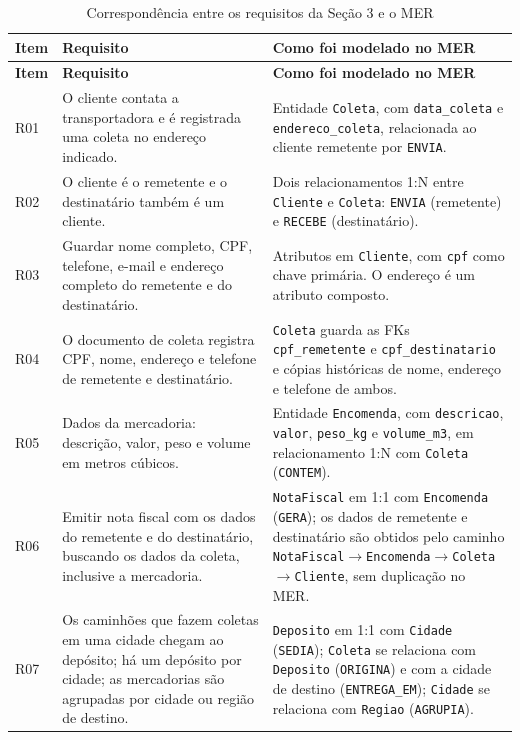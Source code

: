 {\small
\begin{longtable}{@{}L{1.0cm}L{4.6cm}L{9.4cm}@{}}
\caption{Correspondência entre os requisitos da Seção 3 e o MER}
\label{tab:requisitos_mer}\\
\toprule
\textbf{Item} & \textbf{Requisito} & \textbf{Como foi modelado no MER}\\
\midrule
\endfirsthead
\toprule
\textbf{Item} & \textbf{Requisito} & \textbf{Como foi modelado no MER}\\
\midrule
\endhead
\bottomrule
\endfoot

R01 & O cliente contata a transportadora e é registrada uma coleta no endereço indicado. & Entidade \texttt{Coleta}, com \texttt{data\_coleta} e \texttt{endereco\_coleta}, relacionada ao cliente remetente por \texttt{ENVIA}.\\

R02 & O cliente é o remetente e o destinatário também é um cliente. & Dois relacionamentos 1:N entre \texttt{Cliente} e \texttt{Coleta}: \texttt{ENVIA} (remetente) e \texttt{RECEBE} (destinatário).\\

R03 & Guardar nome completo, CPF, telefone, e-mail e endereço completo do remetente e do destinatário. & Atributos em \texttt{Cliente}, com \texttt{cpf} como chave primária. O endereço é um atributo composto.\\

R04 & O documento de coleta registra CPF, nome, endereço e telefone de remetente e destinatário. & \texttt{Coleta} guarda as FKs \texttt{cpf\_remetente} e \texttt{cpf\_destinatario} e cópias históricas de nome, endereço e telefone de ambos.\\

R05 & Dados da mercadoria: descrição, valor, peso e volume em metros cúbicos. & Entidade \texttt{Encomenda}, com \texttt{descricao}, \texttt{valor}, \texttt{peso\_kg} e \texttt{volume\_m3}, em relacionamento 1:N com \texttt{Coleta} (\texttt{CONTEM}).\\

R06 & Emitir nota fiscal com os dados do remetente e do destinatário, buscando os dados da coleta, inclusive a mercadoria. & \texttt{NotaFiscal} em 1:1 com \texttt{Encomenda} (\texttt{GERA}); os dados de remetente e destinatário são obtidos pelo caminho \texttt{NotaFiscal}$\rightarrow$\texttt{Encomenda}$\rightarrow$\texttt{Coleta}$\rightarrow$\texttt{Cliente}, sem duplicação no MER.\\

R07 & Os caminhões que fazem coletas em uma cidade chegam ao depósito; há um depósito por cidade; as mercadorias são agrupadas por cidade ou região de destino. & \texttt{Deposito} em 1:1 com \texttt{Cidade} (\texttt{SEDIA}); \texttt{Coleta} se relaciona com \texttt{Deposito} (\texttt{ORIGINA}) e com a cidade de destino (\texttt{ENTREGA\_EM}); \texttt{Cidade} se relaciona com \texttt{Regiao} (\texttt{AGRUPIA}).\\


\end{longtable}}
